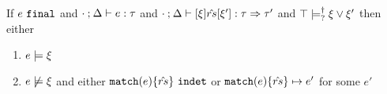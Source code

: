 \begin{lem}
  \label{lem:final-undet-match-progress}
  If $e ~\mathtt{final}$ and $\cdot \mathbin{;} \Delta \vdash e : \tau$ and $\cdot \mathbin{;} \Delta \vdash [\xi] \hat{rs} [\xi'] : \tau \Rightarrow \tau'$ and $\top \models_{?}^{\dag} \xi \vee \xi'$
  then either
  \begin{enumerate}
    \item $e \models \xi$
    \item $e \not\models \xi$ and either $\mathtt{match}(e) \{\hat{rs}\} ~\mathtt{indet}$ or $\mathtt{match}(e) \{\hat{rs}\} \mapsto e'$ for some $e'$
  \end{enumerate}
\end{lem}
